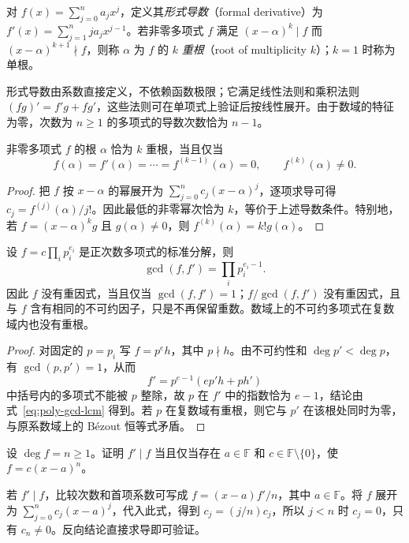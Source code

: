 \begin{definition}
对 $f(x)=\sum_{j=0}^n a_jx^j$，定义其\emph{形式导数}（formal derivative）为 $f'(x)=\sum_{j=1}^n ja_jx^{j-1}$。若非零多项式 $f$ 满足 $(x-\alpha)^k\mid f$ 而 $(x-\alpha)^{k+1}\nmid f$，则称 $\alpha$ 为 $f$ 的 $k$ \emph{重根}（root of multiplicity $k$）；$k=1$ 时称为单根。
\end{definition}

形式导数由系数直接定义，不依赖函数极限；它满足线性法则和乘积法则 $(fg)'=f'g+fg'$，这些法则可在单项式上验证后按线性展开。由于数域的特征为零，次数为 $n\geq1$ 的多项式的导数次数恰为 $n-1$。

\begin{theorem}[重根的导数判据]
\label{thm:poly-multiple-root}
非零多项式 $f$ 的根 $\alpha$ 恰为 $k$ 重根，当且仅当
\[
    f(\alpha)=f'(\alpha)=\cdots=f^{(k-1)}(\alpha)=0,
    \qquad f^{(k)}(\alpha)\ne0.
\]
\end{theorem}
\begin{proof}
把 $f$ 按 $x-\alpha$ 的幂展开为 $\sum_{j=0}^n c_j(x-\alpha)^j$，逐项求导可得 $c_j=f^{(j)}(\alpha)/j!$。因此最低的非零幂次恰为 $k$，等价于上述导数条件。特别地，若 $f=(x-\alpha)^kg$ 且 $g(\alpha)\ne0$，则 $f^{(k)}(\alpha)=k!g(\alpha)$。
\end{proof}

\begin{proposition}[重因式与无重因式部分]
\label{prop:poly-squarefree}
设 $f=c\prod_i p_i^{e_i}$ 是正次数多项式的标准分解，则
\[
    \gcd(f,f')=\prod_i p_i^{e_i-1}.
\]
因此 $f$ 没有重因式，当且仅当 $\gcd(f,f')=1$；$f/\gcd(f,f')$ 没有重因式，且与 $f$ 含有相同的不可约因子，只是不再保留重数。数域上的不可约多项式在复数域内也没有重根。
\end{proposition}
\begin{proof}
对固定的 $p=p_i$ 写 $f=p^eh$，其中 $p\nmid h$。由不可约性和 $\deg p'<\deg p$，有 $\gcd(p,p')=1$，从而
\[
    f'=p^{e-1}(ep'h+ph')
\]
中括号内的多项式不能被 $p$ 整除，故 $p$ 在 $f'$ 中的指数恰为 $e-1$，结论由式~\eqref{eq:poly-gcd-lcm} 得到。若 $p$ 在复数域有重根，则它与 $p'$ 在该根处同时为零，与原系数域上的 Bézout 恒等式矛盾。
\end{proof}

\begin{example}
\label{ex:poly-derivative-divides}
设 $\deg f=n\geq1$。证明 $f'\mid f$ 当且仅当存在 $a\in\mathbb F$ 和 $c\in\mathbb F\setminus\{0\}$，使 $f=c(x-a)^n$。
\end{example}
\begin{solve}
若 $f'\mid f$，比较次数和首项系数可写成 $f=(x-a)f'/n$，其中 $a\in\mathbb F$。将 $f$ 展开为 $\sum_{j=0}^n c_j(x-a)^j$，代入此式，得到 $c_j=(j/n)c_j$，所以 $j<n$ 时 $c_j=0$，只有 $c_n\ne0$。反向结论直接求导即可验证。
\end{solve}


